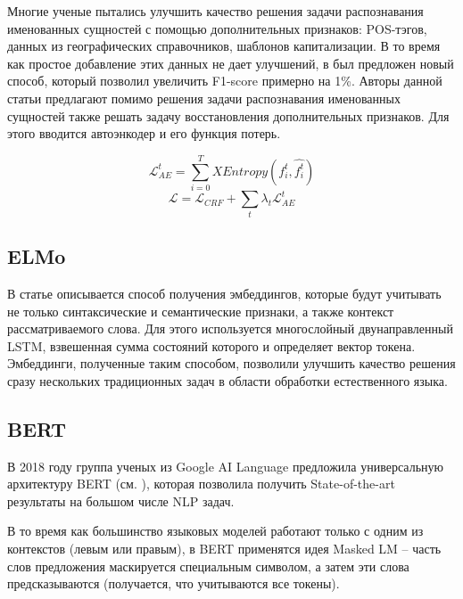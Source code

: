 \documentclass[a4paper,14pt]{extarticle}
\begin{document}
Многие ученые пытались улучшить качество решения задачи распознавания именованных сущностей с помощью дополнительных признаков: POS-тэгов, данных из географических справочников, шаблонов капитализации. В то время как простое добавление этих данных не дает улучшений, в \cite{1808.09075} был предложен новый способ, который позволил увеличить F1-score примерно на 1\%. Авторы данной статьи предлагают помимо решения задачи распознавания именованных сущностей также решать задачу восстановления дополнительных признаков. Для этого вводится автоэнкодер и его функция потерь.

$$\mathcal{L}_{AE}^{t} = \sum_{i=0}^{T}{XEntropy(f_{i}^{t},\hat{f_{i}^{t}})}$$
$$\mathcal{L} = \mathcal{L}_{CRF} + \sum_{t}{\lambda_{t}\mathcal{L}_{AE}^{t}}$$


\clearpage

\subsection{ELMo}

В статье \cite{1802.05365} описывается способ получения эмбеддингов, которые будут учитывать не только синтаксические и семантические признаки, а также контекст рассматриваемого слова. Для этого используется многослойный двунаправленный LSTM, взвешенная сумма состояний которого и определяет вектор токена. Эмбеддинги, полученные таким способом, позволили улучшить качество решения сразу нескольких традиционных задач в области обработки естественного языка.


\subsection{BERT}

В 2018 году группа ученых из Google AI Language предложила универсальную архитектуру BERT (см. \cite{1810.04805}), которая позволила получить State-of-the-art результаты на большом числе NLP задач.

В то время как большинство языковых моделей работают только с одним из контекстов (левым или правым), в BERT применятся идея Masked LM -- часть слов предложения маскируется специальным символом, а затем эти слова предсказываются (получается, что учитываются все токены).
\end{document}
